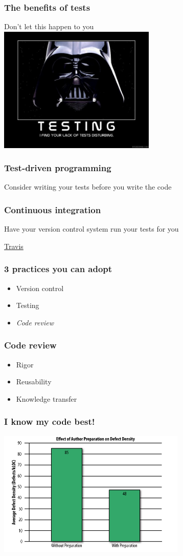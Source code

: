 \documentclass{beamer}
\begin{document}
\begin{frame}
\frametitle{The benefits of tests}
Don't let this happen to you
\\
\includegraphics[height=6cm]{figures/lack_of_tests.jpg}
\end{frame}

\begin{frame}
\frametitle{Test-driven programming}
Consider writing your tests before you write the code
\end{frame}


\begin{frame}
\frametitle{Continuous integration}
Have your version control system run your tests for you

\href{https://travis-ci.org}{Travis}

\end{frame}

\begin{frame}
\frametitle{3 practices you can adopt}
\begin{itemize}
\item
Version control
\item
Testing
\item
\emph{Code review}
\end{itemize}
\end{frame}


\begin{frame}
\frametitle{Code review}
\begin{itemize}
\pause
\item
Rigor
\pause
\item
Reusability
\pause
\item
Knowledge transfer
\end{itemize}
\end{frame}

\begin{frame}
\frametitle{I know my code best!}
\pause
\includegraphics[height=6cm]{figures/two_heads_better_than_one.png}

\end{frame}
\end{document}
